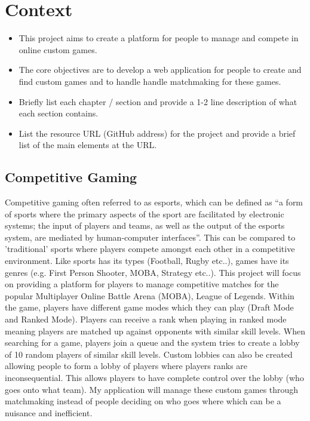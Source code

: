 \chapter{Context}
\begin{itemize}
	\item This project aims to create a platform for people to manage and compete in online custom games.
	\item The core objectives are to develop a web application for people to create and find custom games and to handle handle matchmaking for these games.
	\item Briefly list each chapter / section and provide a 1-2 line description of what each section contains.
	\item List the resource URL (GitHub address) for the project and provide a brief list of the main elements at the URL.
\end{itemize}

\section{Competitive Gaming}
Competitive gaming often referred to as esports, which can be defined as \cite{sjoblom2019esports} “a form of sports where the primary aspects of the sport are facilitated by electronic systems; the input of players and teams, as well as the output of the esports system, are mediated by human-computer interfaces”. This can be compared to 'traditional' sports where players compete amongst each other in a competitive environment. Like sports has its types (Football, Rugby etc..), games have its genres (e.g. First Person Shooter, MOBA, Strategy etc..).
\newline
This project will focus on providing a platform for players to manage competitive matches for the popular Multiplayer Online Battle Arena (MOBA), League of Legends.
\newline
Within the game, players have different game modes which they can play
(Draft Mode and Ranked Mode). Players can receive a rank when playing in ranked mode meaning players are matched up against opponents with similar skill levels. When searching for a game, players join a queue and the system tries to create a lobby of 10 random players of similar skill levels. Custom lobbies can also be created allowing people to form a lobby of players where players ranks are inconsequential. This allows players to have complete control over the lobby (who goes onto what team). My application will manage these custom games through matchmaking instead of people deciding on who goes where which can be a nuisance and inefficient.


